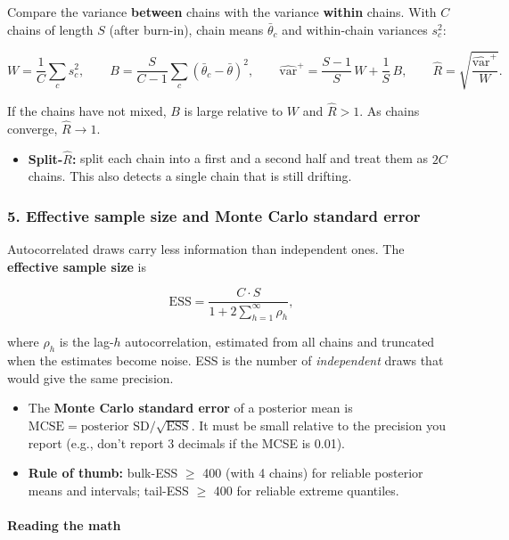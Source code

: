 Compare the variance \textbf{between} chains with the variance
\textbf{within} chains. With \(C\) chains of length \(S\) (after
burn-in), chain means \(\bar\theta_c\) and within-chain variances
\(s_c^2\):

\[
W = \frac{1}{C}\sum_c s_c^2, \qquad
B = \frac{S}{C-1}\sum_c (\bar\theta_c - \bar\theta)^2, \qquad
\widehat{\mathrm{var}}^{+} = \frac{S-1}{S}\,W + \frac{1}{S}\,B, \qquad
\hat R = \sqrt{\frac{\widehat{\mathrm{var}}^{+}}{W}}.
\]

If the chains have not mixed, \(B\) is large relative to \(W\) and
\(\hat R > 1\). As chains converge, \(\hat R \to 1\).

\begin{itemize}
\tightlist
\item
  \textbf{Split-\(\hat R\):} split each chain into a first and a second
  half and treat them as \(2C\) chains. This also detects a single chain
  that is still drifting.
\end{itemize}

\subsubsection{5. Effective sample size and Monte Carlo standard error}

Autocorrelated draws carry less information than independent ones. The
\textbf{effective sample size} is

\[
\mathrm{ESS} = \frac{C\cdot S}{1 + 2\sum_{h=1}^{\infty}\rho_h},
\]

where \(\rho_h\) is the lag-\(h\) autocorrelation, estimated from all
chains and truncated when the estimates become noise. ESS is the number
of \emph{independent} draws that would give the same precision.

\begin{itemize}
\tightlist
\item
  The \textbf{Monte Carlo standard error} of a posterior mean is
  \(\mathrm{MCSE} = \text{posterior SD}/\sqrt{\mathrm{ESS}}\). It must
  be small relative to the precision you report (e.g., don't report 3
  decimals if the MCSE is 0.01).
\item
  \textbf{Rule of thumb:} bulk-ESS \ensuremath{\geq} 400 (with 4 chains) for reliable
  posterior means and intervals; tail-ESS \ensuremath{\geq} 400 for reliable extreme
  quantiles.
\end{itemize}

\paragraph{Reading the math}

